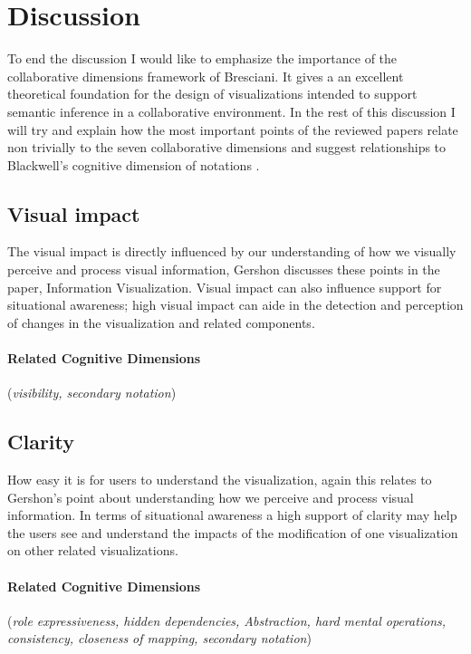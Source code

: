 \documentclass{sig-alternate}
\begin{document}
  \section{Discussion}
To end the discussion I would like to emphasize the importance of the
collaborative dimensions framework of Bresciani. It gives a an excellent
theoretical foundation for the design of visualizations intended to support
semantic inference in a collaborative environment. In the rest of this
discussion I will try and explain how the most important points of the reviewed
papers relate non trivially to the seven collaborative dimensions
\cite{Bresciani:ACollaborativeDimensionsFramework} and suggest relationships to
Blackwell's cognitive dimension of notations \cite{Blackwell:NotationalSystems}.

\subsection{Visual impact}
The visual impact is directly influenced by our understanding of how we visually
perceive  and process visual information, Gershon discusses these points in the
paper, Information Visualization. Visual impact can also influence support for
situational awareness; high visual impact can aide in the detection and
perception of changes in the visualization and related components.

\paragraph{ Related Cognitive Dimensions}
(\emph{visibility, secondary notation})

\subsection{Clarity}
How easy it is for users to understand the visualization, again this relates to
Gershon's point about understanding how we perceive and process visual
information. In terms of situational awareness a high support of clarity may
help the users see and understand the impacts of the modification of one
visualization on other related visualizations.

\paragraph{Related Cognitive Dimensions}
(\emph{role expressiveness, hidden dependencies, Abstraction, hard mental
operations, consistency, closeness of mapping, secondary notation})
\end{document}
